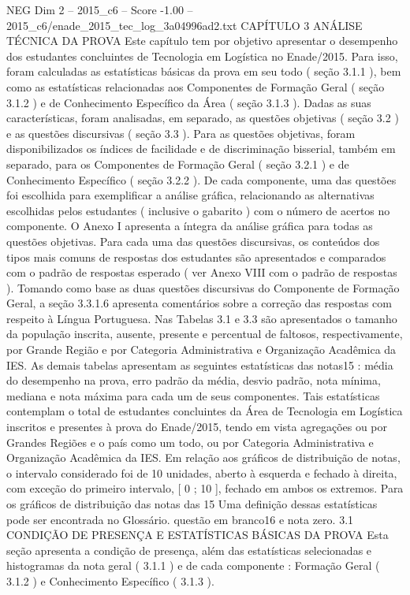 \begin{textsample}{NEG Dim 2 – 2015\_c6 – Score -1.00 – 2015\_c6/enade\_2015\_tec\_log\_3a04996ad2.txt}  \label{ex:f2_neg_197}
CAPÍTULO 3 ANÁLISE TÉCNICA DA PROVA Este capítulo tem por objetivo apresentar o desempenho dos estudantes concluintes de Tecnologia em Logística no Enade/2015.
Para isso, foram calculadas as estatísticas básicas da prova em seu todo ( seção 3.1.1 ), bem como as estatísticas relacionadas aos Componentes de Formação Geral ( seção 3.1.2 ) e de Conhecimento Específico da Área ( seção 3.1.3 ).
Dadas as suas características, foram analisadas, em separado, as questões objetivas ( seção 3.2 ) e as questões discursivas ( seção 3.3 ).
Para as questões objetivas, foram disponibilizados os índices de facilidade e de discriminação bisserial, também em separado, para os Componentes de Formação Geral ( seção 3.2.1 ) e de Conhecimento Específico ( seção 3.2.2 ).
De cada componente, uma das questões foi escolhida para exemplificar a análise gráfica, relacionando as alternativas escolhidas pelos estudantes ( inclusive o gabarito ) com o número de acertos no componente.
O Anexo I apresenta a íntegra da análise gráfica para todas as questões objetivas.
Para cada uma das questões discursivas, os conteúdos dos tipos mais comuns de respostas dos estudantes são apresentados e comparados com o padrão de respostas esperado ( ver Anexo VIII com o padrão de respostas ).
Tomando como base as duas questões discursivas do Componente de Formação Geral, a seção 3.3.1.6 apresenta comentários sobre a correção das respostas com respeito à Língua Portuguesa.
Nas Tabelas 3.1 e 3.3 são apresentados o tamanho da população inscrita, ausente, presente e percentual de faltosos, respectivamente, por Grande Região e por Categoria Administrativa e Organização Acadêmica da IES.
As demais tabelas apresentam as seguintes estatísticas das notas15 : média do desempenho na prova, erro padrão da média, desvio padrão, nota mínima, mediana e nota máxima para cada um de seus componentes.
Tais estatísticas contemplam o total de estudantes concluintes da Área de Tecnologia em Logística inscritos e presentes à prova do Enade/2015, tendo em vista agregações ou por Grandes Regiões e o país como um todo, ou por Categoria Administrativa e Organização Acadêmica da IES.
Em relação aos gráficos de distribuição de notas, o intervalo considerado foi de 10 unidades, aberto à esquerda e fechado à direita, com exceção do primeiro intervalo, [ 0 ; 10 ], fechado em ambos os extremos.
Para os gráficos de distribuição das notas das 15 Uma definição dessas estatísticas pode ser encontrada no Glossário. questão em branco16 e nota zero. 3.1 CONDIÇÃO DE PRESENÇA E ESTATÍSTICAS BÁSICAS DA PROVA Esta seção apresenta a condição de presença, além das estatísticas selecionadas e histogramas da nota geral ( 3.1.1 ) e de cada componente : Formação Geral ( 3.1.2 ) e Conhecimento Específico ( 3.1.3 ).

\end{textsample}
